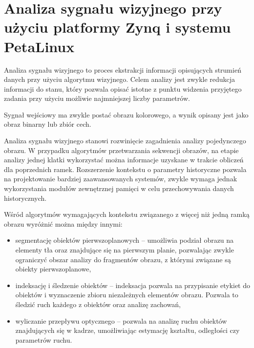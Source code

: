 \chapter{Analiza sygnału wizyjnego przy użyciu platformy Zynq i systemu PetaLinux}
\label{cha:project}




Analiza sygnału wizyjnego to proces ekstrakcji informacji opisujących strumień danych przy użyciu algorytmu wizyjnego. 
Celem analizy jest zwykle redukcja informacji do stanu, który pozwala opisać istotne z punktu widzenia przyjętego zadania przy użyciu możliwie najmniejszej liczby parametrów.  %


Sygnał wejściowy ma zwykle postać obrazu kolorowego, a wynik opisany jest jako obraz binarny lub zbiór cech. %

Analiza sygnału wizyjnego stanowi rozwinięcie zagadnienia analizy pojedynczego obrazu. %
W przypadku algorytmów przetwarzania sekwencji obrazów, na etapie analizy jednej klatki wykorzystać można informacje uzyskane w trakcie obliczeń dla poprzednich ramek. 
Rozszerzenie kontekstu o parametry historyczne pozwala na projektowanie bardziej zaawansowanych systemów, zwykle wymaga jednak wykorzystania modułów zewnętrznej pamięci w celu przechowywania danych historycznych.

Wśród algorytmów wymagających kontekstu związanego z więcej niż jedną ramką obrazu wyróżnić można między innymi:
\begin{itemize}
	\item segmentację obiektów pierwszoplanowych -- umożliwia podział obrazu na elementy tła oraz znajdujące się na pierwszym planie, pozwalając zwykle ograniczyć obszar analizy do fragmentów obrazu, z którymi związane są obiekty pierwszoplanowe,

	\item indeksację i śledzenie obiektów -- indeksacja pozwala na przypisanie etykiet do obiektów i wyznaczenie zbioru niezależnych elementów obrazu. Pozwala to śledzić ruch każdego z obiektów oraz analizę zachowań,
	
	\item wyliczanie przepływu optycznego -- pozwala na analizę ruchu obiektów znajdujących się w kadrze, umożliwiając estymację kształtu, odległości czy parametrów ruchu. %
	
\end{itemize}

